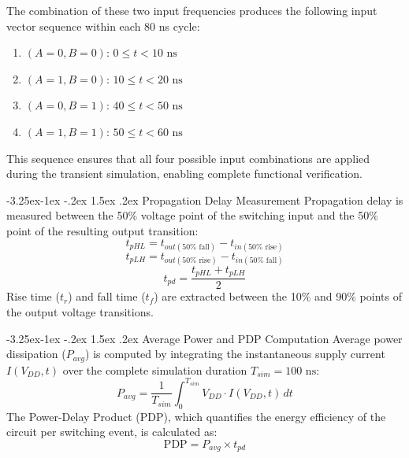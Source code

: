 \documentclass[12pt,a4paper,oneside]{report}
\makeatletter
\renewcommand\subsection{\@startsection{subsection}{2}{\z@}%
                                     {-3.25ex\@plus -1ex \@minus -.2ex}%
                                     {1.5ex \@plus .2ex}%
                                     {\normalfont\normalsize\bfseries\itshape}}
\makeatother
\begin{document}
The combination of these two input frequencies produces the following input vector sequence within each 80 ns cycle:
\begin{enumerate}
\item $(A=0, B=0)$: $0 \le t < 10\text{ ns}$
\item $(A=1, B=0)$: $10 \le t < 20\text{ ns}$
\item $(A=0, B=1)$: $40 \le t < 50\text{ ns}$
\item $(A=1, B=1)$: $50 \le t < 60\text{ ns}$
\end{enumerate}

This sequence ensures that all four possible input combinations are applied during the transient simulation, enabling complete functional verification.

\subsection{Propagation Delay Measurement}
Propagation delay is measured between the 50\% voltage point of the switching input and the 50\% point of the resulting output transition:
\begin{equation}
t_{pHL} = t_{out(50\% \text{ fall})} - t_{in(50\% \text{ rise})}
\end{equation}
\begin{equation}
t_{pLH} = t_{out(50\% \text{ rise})} - t_{in(50\% \text{ fall})}
\end{equation}
\begin{equation}
t_{pd} = \frac{t_{pHL} + t_{pLH}}{2}
\label{eq:tpd_def}
\end{equation}
Rise time ($t_r$) and fall time ($t_f$) are extracted between the 10\% and 90\% points of the output voltage transitions.

\subsection{Average Power and PDP Computation}
Average power dissipation ($P_{avg}$) is computed by integrating the instantaneous supply current $I(V_{DD}, t)$ over the complete simulation duration $T_{sim} = 100\text{ ns}$:
\begin{equation}
P_{avg} = \frac{1}{T_{sim}} \int_0^{T_{sim}} V_{DD} \cdot I(V_{DD}, t) \, dt
\label{eq:pavg_integral}
\end{equation}
The Power-Delay Product (PDP), which quantifies the energy efficiency of the circuit per switching event, is calculated as:
\begin{equation}
\text{PDP} = P_{avg} \times t_{pd}
\label{eq:pdp_def}
\end{equation}
\end{document}

